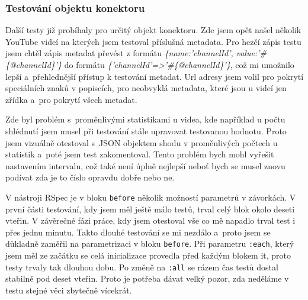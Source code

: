\subsubsection{Testování objektu konektoru}
\par Další testy již probíhaly pro určitý objekt konektoru. Zde jsem opět našel několik YouTube videí na kterých jsem testoval příslušná metadata. Pro hezčí zápis testu jsem chtěl zápis metadat převést z formátu \textit{\{name:'channelId', value:'\#\{@channelId\}'\}} do formátu \textit{\{'channelId'=>'\#\{@channelId\}'\}}, což mi umožnilo lepší a~přehlednější přístup k testování metadat. Url adresy jsem volil pro pokrytí speciálních znaků v popiscích, pro neobvyklá metadata, které jsou u videí jen zřídka a~pro pokrytí všech metadat. 
\par Zde byl problém s~proměnlivými statistikami u videa, kde například u počtu shlédnutí jsem musel při testování stále upravovat testovanou hodnotu. Proto jsem vizuálně otestoval s~JSON objektem shodu v proměnlivých počtech u statistik a~poté jsem test zakomentoval. Tento problém bych mohl vyřešit nastavením intervalu, což také není úplně nejlepší neboť bych se musel znovu podívat zda je to číslo opravdu dobře nebo ne.
\par V nástroji RSpec je v bloku \texttt{before} několik možností parametrů v závorkách. V první části testování, kdy jsem měl ještě málo testů, trval celý blok okolo deseti vteřin. V závěrečné fázi práce, kdy jsem otestoval vše co mě napadlo trval test i přes jednu minutu. Takto dlouhé testování se mi nezdálo a~proto jsem se důkladně zaměřil na parametrizaci v bloku \texttt{before}. Při parametru \texttt{:each}, který jsem měl ze začátku se celá inicializace provedla před každým blokem it, proto testy trvaly tak dlouhou dobu. Po změně na \texttt{:all} se rázem čas testů dostal stabilně pod deset vteřin. Proto je potřeba dávat velký pozor, zda neděláme v testu stejné věci zbytečně vícekrát.
